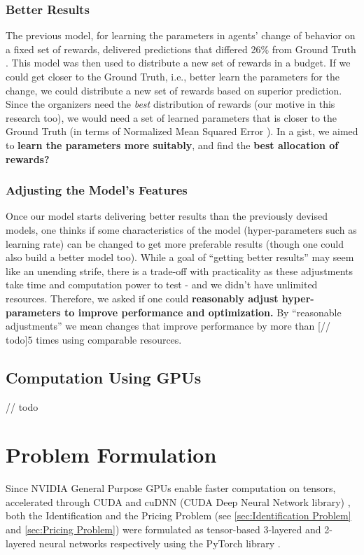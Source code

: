 \documentclass[12pt]{article}
\begin{document}
    \subsubsection{Better Results} \label{sec:Important Questions - Better Results}
    The previous model, for learning the parameters in agents' change of behavior on a fixed set of rewards, delivered predictions that differed 26\% from Ground Truth \cite[// todo]{Xue2016Avi2}. This model was then used to distribute a new set of rewards in a budget. If we could get closer to the Ground Truth, i.e., better learn the parameters for the change, we could distribute a new set of rewards based on superior prediction. Since the organizers need the \textit{best} distribution of rewards (our motive in this research too), we would need a set of learned parameters that is closer to the Ground Truth (in terms of Normalized Mean Squared Error \cite[// todo]{Xue2016Avi2}). In a gist, we aimed to \textbf{learn the parameters more suitably}, and find the \textbf{best allocation of rewards?}
    
    \subsubsection{Adjusting the Model's Features} \label{sec:Important Questions - Adjusting the Model's Features}
    Once our model starts delivering better results than the previously devised models, one thinks if some characteristics of the model (hyper-parameters such as learning rate) can be changed to get more preferable results (though one could also build a better model too). While a goal of ``getting better results'' may seem like an unending strife, there is a trade-off with practicality as these adjustments take time and computation power to test - and we didn't have unlimited resources. Therefore, we asked if one could \textbf{reasonably adjust hyper-parameters to improve performance and optimization.} By ``reasonable adjustments'' we mean changes that improve performance by more than [// todo]5 times using comparable resources.
    
    \subsection{Computation Using GPUs} \label{sec:Computation Using GPUs}
    // todo
    
    \section{Problem Formulation} \label{sec:Problem Formulation}
    Since NVIDIA General Purpose GPUs enable faster computation on tensors, accelerated through CUDA and cuDNN (CUDA Deep Neural Network library) \cite{NVIDIA}, both the Identification and the Pricing Problem (see \cref{sec:Identification Problem} and \cref{sec:Pricing Problem}) were formulated as tensor-based 3-layered and 2-layered neural networks respectively using the PyTorch library \cite{PTDocs}.
    
\end{document}
